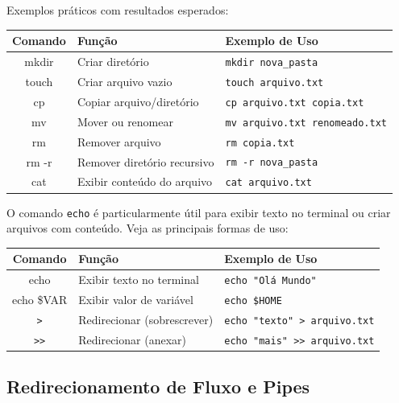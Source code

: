 \documentclass[12pt]{article}
\begin{document}
Exemplos práticos com resultados esperados:

\begin{cmdbox}
\begin{tabularx}{\linewidth}{@{}C >{\raggedright\arraybackslash}X >{\raggedright\arraybackslash}X@{}}
\toprule
\textbf{Comando} & \textbf{Função} & \textbf{Exemplo de Uso} \\
\midrule
mkdir & Criar diretório & \texttt{mkdir nova\_pasta} \\
touch & Criar arquivo vazio & \texttt{touch arquivo.txt} \\
cp & Copiar arquivo/diretório & \texttt{cp arquivo.txt copia.txt} \\
mv & Mover ou renomear & \texttt{mv arquivo.txt renomeado.txt} \\
rm & Remover arquivo & \texttt{rm copia.txt} \\
rm -r & Remover diretório recursivo & \texttt{rm -r nova\_pasta} \\
cat & Exibir conteúdo do arquivo & \texttt{cat arquivo.txt} \\
\bottomrule
\end{tabularx}
\end{cmdbox}

\vspace{0.3cm}

O comando \texttt{echo} é particularmente útil para exibir texto no terminal ou criar arquivos com conteúdo. Veja as principais formas de uso:

\begin{cmdbox}
\begin{tabularx}{\linewidth}{@{}C >{\raggedright\arraybackslash}X >{\raggedright\arraybackslash}X@{}}
\toprule
\textbf{Comando} & \textbf{Função} & \textbf{Exemplo de Uso} \\
\midrule
echo & Exibir texto no terminal & \texttt{echo "Olá Mundo"} \\
echo \$VAR & Exibir valor de variável & \texttt{echo \$HOME} \\
\texttt{>} & Redirecionar (sobrescrever) & \texttt{echo "texto" > arquivo.txt} \\
\texttt{>>} & Redirecionar (anexar) & \texttt{echo "mais" >> arquivo.txt} \\
\bottomrule
\end{tabularx}
\end{cmdbox}

\subsection{Redirecionamento de Fluxo e Pipes}
\end{document}
